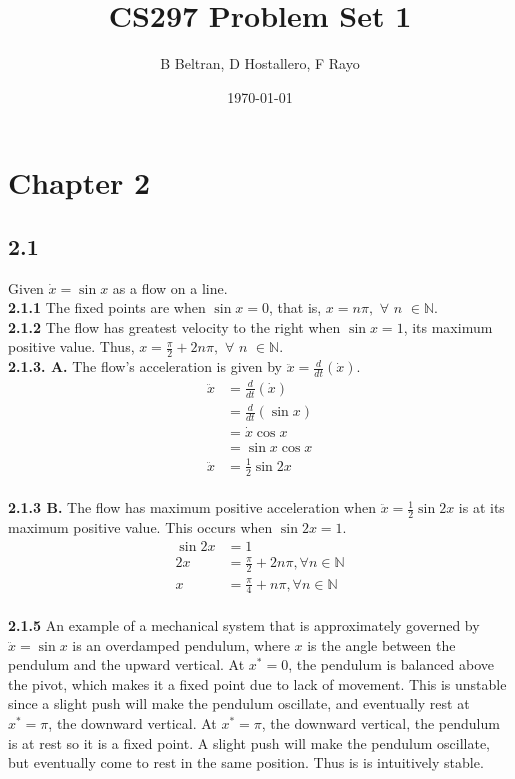 \documentclass[]{article}
\title{CS297 Problem Set 1}
\author{B Beltran, D Hostallero, F Rayo}
\date{\today}
\begin{document}
	
	\maketitle
	
	\section*{Chapter 2}
	\subsection*{2.1}
	Given $\dot{x} = \sin x$ as a flow on a line.
	\\
	
	\textbf{2.1.1} The fixed points are when $\sin x = 0$, that is, $x=n\pi,$ $\forall$ $n$ $\in \mathbb{N}.$
	\\
	
	\textbf{2.1.2} The flow has greatest velocity to the right when $\sin x = 1$, its maximum positive value. Thus, $x = \frac{\pi}{2} + 2n\pi,$ $\forall$ $n$ $\in \mathbb{N}.$
	\\
	
	\textbf{2.1.3. A.} The flow's acceleration is given by $\ddot{x}=\frac{d}{dt}(\dot{x})$.
	\begin{align*}
	\ddot{x}&=\frac{d}{dt}(\dot{x})\\
	&=\frac{d}{dt}(\sin x)\\
	&=\dot{x}\cos x\\
	&=\sin x \cos x\\
	\ddot{x}&=\frac{1}{2}\sin 2x
	\end{align*}
	\\
	
	\textbf{2.1.3 B.} The flow has maximum positive acceleration when $\ddot{x}=\frac{1}{2}\sin 2x$ is at its maximum positive value. This occurs when $\sin 2x = 1$.
	\begin{align*}
	\sin 2x &= 1\\
	2x &= \frac{\pi}{2} + 2n\pi ,\forall n \in \mathbb{N}\\
	x &= \frac{\pi}{4} + n\pi, \forall n \in \mathbb{N}
	\end{align*}
	\\
	
	\textbf{2.1.5} An example of a mechanical system that is approximately governed by $\ddot{x} = \sin x$ is an overdamped pendulum, where $x$ is the angle between the pendulum and the upward vertical. At $x^* = 0$, the pendulum is balanced above the pivot, which makes it a fixed point due to lack of movement. This is unstable since a slight push will make the pendulum oscillate, and eventually rest at $x^* = \pi$, the downward vertical. At $x^* = \pi$, the downward vertical, the pendulum is at rest so it is a fixed point. A slight push will make the pendulum oscillate, but eventually come to rest in the same position. Thus is is intuitively stable.
	
\end{document}
